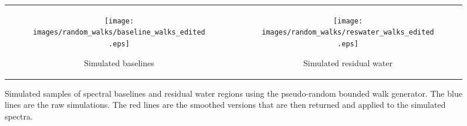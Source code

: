 \documentclass[AMA,LATO1COL]{WileyNJD-v2}
\providecommand{\DIFaddend}{} %
\begin{document}

\DIFaddend 

\begin{figure}[b!]
    \centering
    \begin{tabular}[l]{cc}
    \begin{subfigure}{0.49\textwidth}
        \centering
        \texttt{[image: images/random\_walks/baseline\_walks\_edited.eps]}
        \caption{Simulated baselines}
        \label{fig:baseline_region}
    \end{subfigure} &

    \begin{subfigure}{0.49\textwidth}
        \centering
        \texttt{[image: images/random\_walks/reswater\_walks\_edited.eps]}
        \caption{Simulated residual water}
        \label{fig:reswater_region}
    \end{subfigure}
    \end{tabular}
    \caption{Simulated  samples of spectral baselines and residual water regions using the pseudo-random bounded walk generator. The blue lines are the raw simulations. The red lines are the smoothed versions that are then returned and applied to the simulated spectra.}
    \label{fig:random walk generator}
\end{figure}
\end{document}
